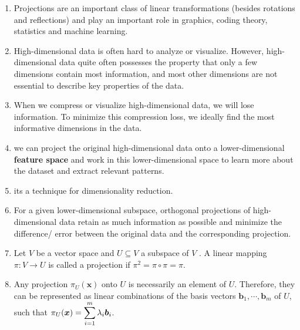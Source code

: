 \begin{enumerate}
    \item Projections are an important class of linear transformations (besides rotations and reflections) and play an important role in graphics, coding theory, statistics and machine learning.
    \hfill \cite{mfml/book/mml/Deisenroth-Faisal-Ong}

    \item High-dimensional data is often hard to analyze or visualize.
    However, high-dimensional data quite often possesses the property that only a few dimensions contain most information, and most other dimensions are not essential to describe key properties of the data.
    \hfill \cite{mfml/book/mml/Deisenroth-Faisal-Ong}

    \item When we compress or visualize high-dimensional data, we will lose information. To minimize this compression loss, we ideally find the most informative dimensions in the data.
    \hfill \cite{mfml/book/mml/Deisenroth-Faisal-Ong}

    \item we can project the original high-dimensional data onto a lower-dimensional \textbf{feature space} and work in this lower-dimensional space to learn more about the dataset and extract relevant patterns.
    \hfill \cite{mfml/book/mml/Deisenroth-Faisal-Ong}

    \item its a technique for dimensionality reduction.
    \hfill \cite{mfml/book/mml/Deisenroth-Faisal-Ong}

    \item For a given lower-dimensional subspace, orthogonal projections of high-dimensional data retain as much information as possible and minimize the difference/ error between the original data and the corresponding projection.
    \hfill \cite{mfml/book/mml/Deisenroth-Faisal-Ong}

    \item
    \begin{definition}[projection]
        Let $V$ be a vector space and $U \subseteq V$ a subspace of $V$ .
        A linear mapping $\pi : V \to U$ is called a projection if $\pi^2 = \pi \circ \pi = \pi$.
        \hfill \cite{mfml/book/mml/Deisenroth-Faisal-Ong}
    \end{definition}

    \item Any projection $\pi_U (\bm{x})$ onto $U$ is necessarily an element of $U$.
    Therefore, they can be represented as linear combinations of the basis vectors $\bm{b}_1, \cdots , \bm{b}_m$ of $U$, such that $\pi_U (\bm{x}) = \displaystyle\sum ^m _{i=1} \lambda_i \bm{b}_i$.
    \hfill \cite{mfml/book/mml/Deisenroth-Faisal-Ong}


\end{enumerate}

